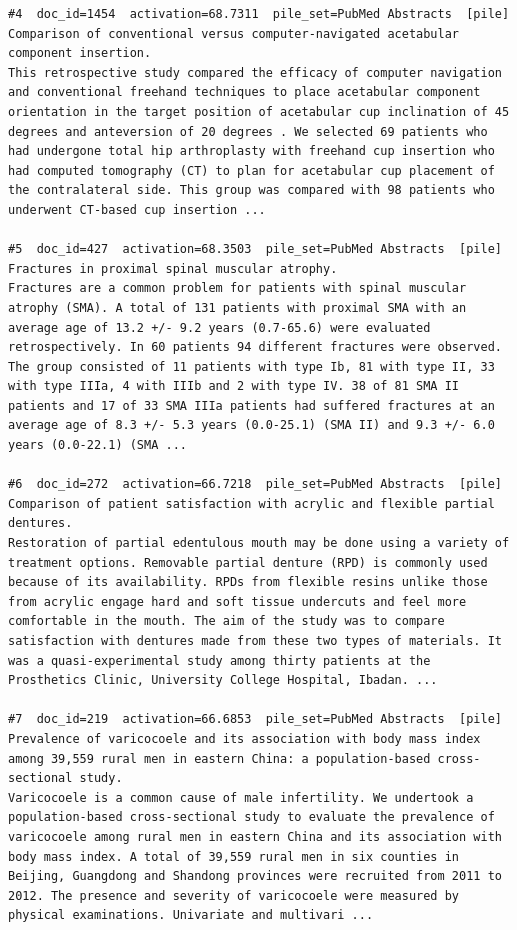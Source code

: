 \begin{verbatim}
#4  doc_id=1454  activation=68.7311  pile_set=PubMed Abstracts  [pile]
Comparison of conventional versus computer-navigated acetabular component insertion.
This retrospective study compared the efficacy of computer navigation and conventional freehand techniques to place acetabular component orientation in the target position of acetabular cup inclination of 45 degrees and anteversion of 20 degrees . We selected 69 patients who had undergone total hip arthroplasty with freehand cup insertion who had computed tomography (CT) to plan for acetabular cup placement of the contralateral side. This group was compared with 98 patients who underwent CT-based cup insertion ...

#5  doc_id=427  activation=68.3503  pile_set=PubMed Abstracts  [pile]
Fractures in proximal spinal muscular atrophy.
Fractures are a common problem for patients with spinal muscular atrophy (SMA). A total of 131 patients with proximal SMA with an average age of 13.2 +/- 9.2 years (0.7-65.6) were evaluated retrospectively. In 60 patients 94 different fractures were observed. The group consisted of 11 patients with type Ib, 81 with type II, 33 with type IIIa, 4 with IIIb and 2 with type IV. 38 of 81 SMA II patients and 17 of 33 SMA IIIa patients had suffered fractures at an average age of 8.3 +/- 5.3 years (0.0-25.1) (SMA II) and 9.3 +/- 6.0 years (0.0-22.1) (SMA ...

#6  doc_id=272  activation=66.7218  pile_set=PubMed Abstracts  [pile]
Comparison of patient satisfaction with acrylic and flexible partial dentures.
Restoration of partial edentulous mouth may be done using a variety of treatment options. Removable partial denture (RPD) is commonly used because of its availability. RPDs from flexible resins unlike those from acrylic engage hard and soft tissue undercuts and feel more comfortable in the mouth. The aim of the study was to compare satisfaction with dentures made from these two types of materials. It was a quasi-experimental study among thirty patients at the Prosthetics Clinic, University College Hospital, Ibadan. ...

#7  doc_id=219  activation=66.6853  pile_set=PubMed Abstracts  [pile]
Prevalence of varicocoele and its association with body mass index among 39,559 rural men in eastern China: a population-based cross-sectional study.
Varicocoele is a common cause of male infertility. We undertook a population-based cross-sectional study to evaluate the prevalence of varicocoele among rural men in eastern China and its association with body mass index. A total of 39,559 rural men in six counties in Beijing, Guangdong and Shandong provinces were recruited from 2011 to 2012. The presence and severity of varicocoele were measured by physical examinations. Univariate and multivari ...


\end{verbatim}

